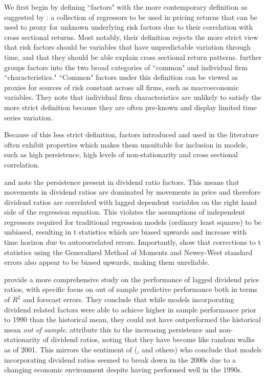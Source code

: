\documentclass[a4paper, table]{article}
\begin{document}
We first begin by defining ``factors" with the more contemporary definition as suggested by \cite{harvey__2016}: a collection of regressors to be used in pricing returns that can be used to proxy for unknown underlying risk factors due to their correlation with cross sectional returns. Most notably, their definition rejects the more strict view that risk factors should be variables that have unpredictable variation through time, and that they should be able explain cross sectional return patterns. \cite{harvey__2016} further groups factors into the two broad categories of ``common" and individual firm ``characteristics." ``Common" factors under this definition can be viewed as proxies for sources of risk constant across all firms, such as macroeconomic variables. They note that individual firm characteristics are unlikely to satisfy the more strict definition because they are often pre-known and display limited time series variation.

Because of this less strict definition, factors introduced and used in the literature often exhibit properties which makes them unsuitable for inclusion in models, such as high persistence, high levels of non-stationarity and cross sectional correlation. 

\cite{goetzmann_testing_1993} and \cite{ang_stock_2006} note the persistence present in dividend ratio factors. This means that movements in dividend ratios are dominated by movements in price and therefore dividend ratios are correlated with lagged dependent variables on the right hand side of the regression equation. This violates the assumptions of independent regressors required for traditional regression models (ordinary least squares) to be unbiased, resulting in t statistics which are biased upwards and increase with time horizon due to autocorrelated errors. Importantly, \cite{goetzmann_testing_1993} show that corrections to t statistics using the Generalized Method of Moments and Newey-West standard errors also appear to be biased upwards, making them unreliable. 

\cite{goyal_predicting_2003} provide a more comprehensive study on the performance of lagged dividend price ratios, with specific focus on out of sample predictive performance both in terms of $R^2$ and forecast errors. They conclude that while models incorporating dividend related factors were able to achieve higher in sample performance prior to 1990 than the historical mean, they could not have outperformed the historical mean \textit{out of sample}. \cite{goyal_predicting_2003} attribute this to the increasing persistence and non-stationarity of dividend ratios, noting that they have become like random walks as of 2001. This mirrors the sentiment of (\cite{lettau_consumption_2001}, \cite{schwert_anomalies_2003} and others) who conclude that models incorporating dividend ratios seemed to break down in the 2000s due to a changing economic environment despite having performed well in the 1990s.
\end{document}

